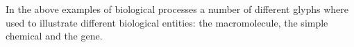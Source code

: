 
In the above examples of biological processes a number of different glyphs where used to illustrate different biological entities: the macromolecule, the simple chemical and the gene.












